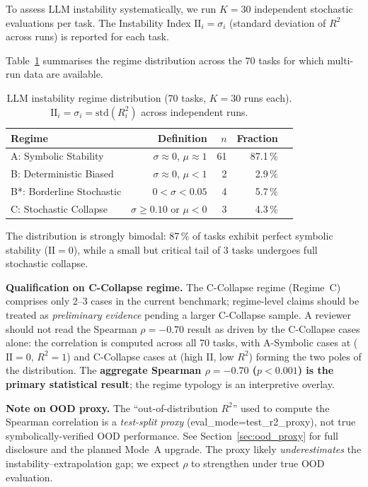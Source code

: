 \documentclass[twoside,11pt]{article}
\newcommand{\Rsq}{R^{2}}
\newcommand{\II}{\mathrm{II}}
\begin{document}
To assess LLM instability systematically, we run $K=30$ independent stochastic
evaluations per task.  The Instability Index $\II_i = \sigma_i$ (standard deviation
of $\Rsq$ across runs) is reported for each task.

Table~\ref{tab:instability} summarises the regime distribution across the 70 tasks
for which multi-run data are available.

\begin{table}[h]
\centering
\caption{LLM instability regime distribution (70 tasks, $K=30$ runs each).
$\II_i = \sigma_i = \mathrm{std}(R^2_i)$ across independent runs.}
\label{tab:instability}
\begin{tabular}{lrrrr}
\toprule
Regime & Definition & $n$ & Fraction \\
\midrule
A: Symbolic Stability   & $\sigma\approx0$, $\mu\approx1$            & 61 & 87.1\,\% \\
B: Deterministic Biased & $\sigma\approx0$, $\mu<1$                  &  2 & 2.9\,\%  \\
B*: Borderline Stochastic & $0 < \sigma < 0.05$                      &  4 & 5.7\,\%  \\
C: Stochastic Collapse  & $\sigma \ge 0.10$ or $\mu < 0$             &  3 & 4.3\,\%  \\
\bottomrule
\end{tabular}
\end{table}

The distribution is strongly bimodal: 87\,\% of tasks exhibit perfect symbolic
stability ($\II=0$), while a small but critical tail of 3 tasks undergoes full
stochastic collapse.

\textbf{Qualification on C-Collapse regime.}  The C-Collapse regime
(Regime~C) comprises only 2--3 cases in the current benchmark; regime-level
claims should be treated as \emph{preliminary evidence} pending a larger
C-Collapse sample.  A reviewer should not read the Spearman $\rho=-0.70$ result
as driven by the C-Collapse cases alone: the correlation is computed across all
70 tasks, with A-Symbolic cases at ($\II=0$, $\Rsq=1$) and C-Collapse cases at
(high $\II$, low $\Rsq$) forming the two poles of the distribution.  The
\textbf{aggregate Spearman $\rho=-0.70$ ($p<0.001$) is the primary statistical
result}; the regime typology is an interpretive overlay.

\textbf{Note on OOD proxy.}  The ``out-of-distribution $\Rsq$'' used to compute
the Spearman correlation is a \emph{test-split proxy} (eval\_mode=test\_r2\_proxy),
not true symbolically-verified OOD performance.  See Section~\ref{sec:ood_proxy}
for full disclosure and the planned Mode~A upgrade.  The proxy likely
\emph{underestimates} the instability--extrapolation gap; we expect $\rho$ to
strengthen under true OOD evaluation.
\end{document}
